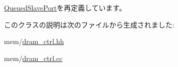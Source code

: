 \hyperlink{classQueuedSlavePort_a89fcdbe2ab63d24f2112bc7e05bf2413}{QueuedSlavePort}を再定義しています。

このクラスの説明は次のファイルから生成されました:\begin{DoxyCompactItemize}
\item 
mem/\hyperlink{dram__ctrl_8hh}{dram\_\-ctrl.hh}\item 
mem/\hyperlink{dram__ctrl_8cc}{dram\_\-ctrl.cc}\end{DoxyCompactItemize}
